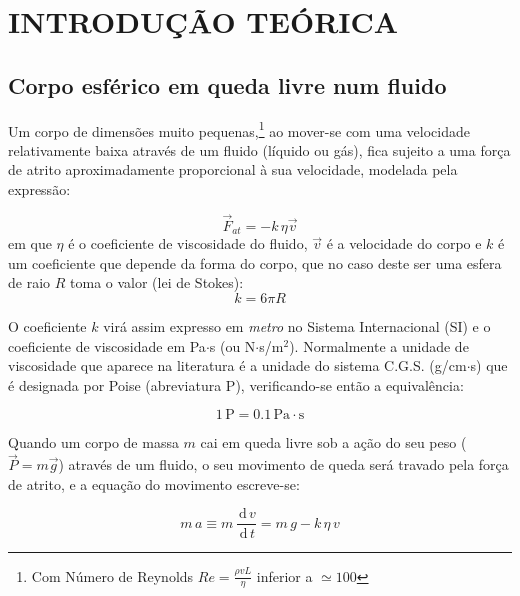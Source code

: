 \documentclass[a4paper,twoside,12pt]{article}      %
\newcommand{\ud}{\,\mathrm{d}}
\begin{document}
\section{\sf INTRODUÇÃO TEÓRICA}
\subsection{\sf Corpo esférico em queda livre num fluido}
Um corpo de dimensões muito pequenas,\footnote{Com Número de Reynolds $Re= \frac{\rho v L}{\eta}$ inferior a $\simeq 100$}  ao mover-se com uma velocidade relativamente baixa através de um fluido (líquido ou gás), fica sujeito a uma força de atrito aproximadamente proporcional à sua velocidade, modelada pela expressão:

\begin{equation}
	\label{eq:f_atrito}
	\vec{F}_{at} = - k \, \eta \vec{v}
\end{equation}
em que $\eta$ é o coeficiente de viscosidade do fluido, $\vec{v}$ é a velocidade do corpo e $k$ é um coeficiente que depende da forma do corpo, que no caso deste ser uma esfera de raio $R$ toma o valor (lei de Stokes): 
\begin{equation}
	\label{eq:coef_atrito}
	k = 6 \pi R
\end{equation}


O coeficiente $k$ virá assim expresso em \emph{metro} no Sistema Internacional (SI) e o coeficiente de viscosidade em Pa$\cdot$s (ou N$\cdot$s/m$^2$).
Normalmente a unidade de viscosidade que aparece na literatura é a unidade do sistema C.G.S. (g/cm$\cdot$s) que é designada por Poise (abreviatura P), verificando-se então a equivalência:

\begin{equation*}
	1 \, \mathrm{P} = 0.1\, \mathrm{Pa}\cdot\mathrm{s}
\end{equation*}

Quando um corpo de massa $m$ cai em queda livre sob a ação do seu peso ($\vec{P}=m\vec{g}$) através de um fluido, o seu movimento de queda será travado pela força de atrito, e a equação do movimento escreve-se:

\begin{equation}
	\label{eq:mov}
	m\,a \equiv m\, \frac{\ud\, v}{\ud\, t} =  m\,g - k  \, \eta \, v
\end{equation}
\end{document}
